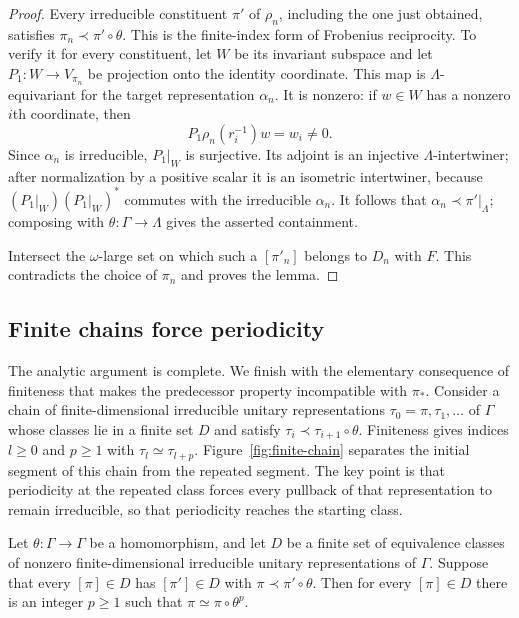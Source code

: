 \begin{proof}
Every irreducible constituent $\pi'$ of $\rho_n$, including the one
just obtained, satisfies $\pi_n\prec\pi'\circ\theta$. This is the
finite-index form of Frobenius reciprocity. To verify it for every
constituent, let $W$ be its invariant subspace
and let $P_1:W\to V_{\pi_n}$ be projection onto the identity
coordinate.  This map is $\Lambda$-equivariant for the target
representation $\alpha_n$.  It is nonzero: if $w\in W$ has a nonzero
$i$th coordinate, then
\[
 P_1\rho_n(r_i^{-1})w=w_i\ne0.
\]
Since $\alpha_n$ is irreducible, $P_1|_W$ is surjective.  Its adjoint
is an injective $\Lambda$-intertwiner; after normalization by a
positive scalar it is an isometric intertwiner, because
$(P_1|_W)(P_1|_W)^*$ commutes with the irreducible $\alpha_n$.
It follows that $\alpha_n\prec\pi'|_\Lambda$; composing with
$\theta:\Gamma\to\Lambda$ gives the asserted containment.

Intersect the $\omega$-large set on which such a $[\pi'_n]$ belongs to
$D_n$ with $F$.  This contradicts the choice of $\pi_n$ and proves
the lemma.
\end{proof}

\subsection{Finite chains force periodicity}

The analytic argument is complete.  We finish with the elementary
consequence of finiteness that makes the predecessor property
incompatible with $\pi_*$. Consider a chain of finite-dimensional
irreducible unitary representations $\tau_0=\pi,\tau_1,\ldots$ of
$\Gamma$ whose classes lie in a
finite set $D$ and satisfy $\tau_i\prec\tau_{i+1}\circ\theta$.
Finiteness gives indices $l\geq0$ and $p\geq1$ with
$\tau_l\simeq\tau_{l+p}$.
Figure~\ref{fig:finite-chain} separates the initial segment of this
chain from the repeated segment.
The key point is that periodicity at the repeated class forces every
pullback of that representation to remain irreducible, so that
periodicity reaches the starting class.



\begin{lemma}\label{lem:finite-predecessor-cycle}
Let $\theta:\Gamma\to\Gamma$ be a homomorphism, and let $D$ be a
finite set of equivalence classes of nonzero finite-dimensional
irreducible unitary representations of $\Gamma$.  Suppose that every
$[\pi]\in D$ has $[\pi']\in D$ with $\pi\prec\pi'\circ\theta$.
Then for every $[\pi]\in D$ there is an integer $p\geq1$ such that
$\pi\simeq\pi\circ\theta^p$.
\end{lemma}


